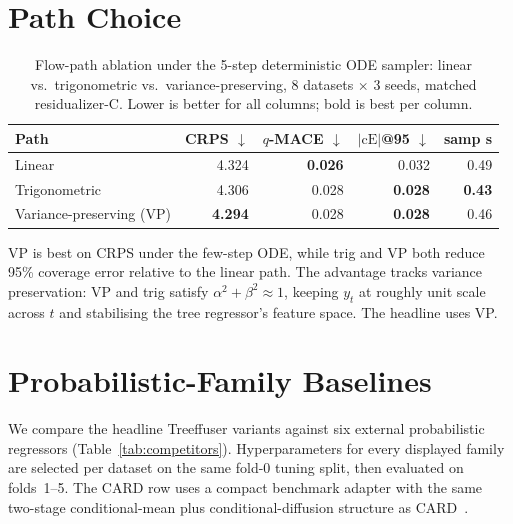 \documentclass{tpm2026}
\begin{document}
\section{Path Choice}\label{app:path}

\begin{table}[!h]
  \centering
  \caption{Flow-path ablation under the 5-step deterministic ODE sampler: linear vs.\ trigonometric vs.\ variance-preserving, 8 datasets $\times$ 3 seeds, matched residualizer-C. Lower is better for all columns; bold is best per column.}\label{tab:path}
  \footnotesize
  \begin{tabular}{lrrrr}
    \toprule
    Path & CRPS $\downarrow$ & $q$-MACE $\downarrow$ & $|\text{cE}|$@95 $\downarrow$ & samp s \\
    \midrule
    Linear         & 4.324 & \textbf{0.026} & 0.032 & 0.49 \\
    Trigonometric  & 4.306 & 0.028 & \textbf{0.028} & \textbf{0.43} \\
    Variance-preserving (VP) & \textbf{4.294} & 0.028 & \textbf{0.028} & 0.46 \\
    \bottomrule
  \end{tabular}
\end{table}

VP is best on CRPS under the few-step ODE, while trig and VP both reduce 95\% coverage error relative to the linear path. The advantage tracks variance preservation: VP and trig satisfy $\alpha^2+\beta^2 \approx 1$, keeping $y_t$ at roughly unit scale across $t$ and stabilising the tree regressor's feature space. The headline uses VP.

\section{Probabilistic-Family Baselines}\label{app:competitors}

We compare the headline Treeffuser variants against six external probabilistic regressors (Table~\ref{tab:competitors}). Hyperparameters for every displayed family are selected per dataset on the same fold-0 tuning split, then evaluated on folds~1--5. The CARD row uses a compact benchmark adapter with the same two-stage conditional-mean plus conditional-diffusion structure as CARD~\citep{han2022card}.
\end{document}
